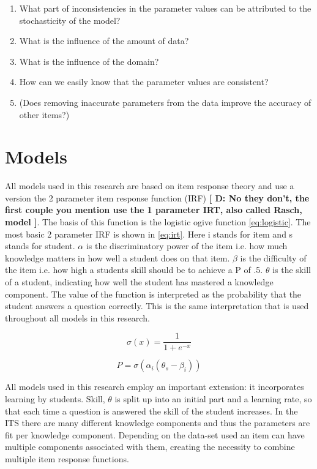 \documentclass{scrartcl}
\providecommand{\comm}[1]{{\bf[ #1 ]}}
\providecommand{\commd}[1]{\comm{D: {#1}}}
\begin{document}
\begin{enumerate}
\item What part of inconsistencies in the parameter values can be attributed to the stochasticity of the model?
\item What is the influence of the amount of data?
\item What is the influence of the domain?
\item How can we easily know that the parameter values are consistent?
\item (Does removing inaccurate parameters from the data improve the accuracy of other items?)
\end{enumerate}


\section{Models}
All models used in this research are based on item response theory and use a version the 2 parameter item response function (IRF) \commd{No they don't, the first couple you mention use the 1 parameter IRT, also called Rasch, model}. The basis of this function is the logistic ogive function \ref{eq:logistic}. The most basic 2 parameter IRF is shown in \ref{eq:irt}. Here i stands for item and s stands for student. $\alpha$ is the discriminatory power of the item i.e. how much knowledge matters in how well a student does on that item. $\beta$ is the difficulty of the item i.e. how high a students skill should be to achieve a P of .5. $\theta$ is the skill of a student, indicating how well the student has mastered a knowledge component. The value of the function is interpreted as the probability that the student answers a question correctly. This is the same interpretation that is used throughout all models in this research.

\begin{equation}
\label{eq:logistic}
\sigma(x) = \frac{1}{1+e^{-x}}
\end{equation}

\begin{equation}
\label{eq:irt}
P = \sigma(\alpha_{i} (\theta_{s} - \beta_{i}))
\end{equation}

All models used in this research employ an important extension: it incorporates learning by students. Skill, $\theta$ is split up into an initial part and a learning rate, so that each time a question is answered the skill of the student increases. In the ITS there are many different knowledge components and thus the parameters are fit per knowledge component. Depending on the data-set used an item can have multiple components associated with them, creating the necessity to combine multiple item response functions.
\end{document}
